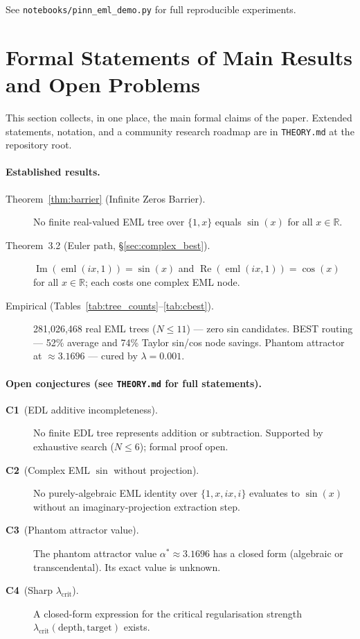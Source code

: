 \documentclass[11pt,a4paper]{article}
\begin{document}
See \texttt{notebooks/pinn\_eml\_demo.py} for full reproducible experiments.

\section{Formal Statements of Main Results and Open Problems}
\label{sec:formal}

This section collects, in one place, the main formal claims of the paper.
Extended statements, notation, and a community research roadmap are in
\texttt{THEORY.md} at the repository root.

\paragraph{Established results.}
\begin{description}
  \item[Theorem~\ref{thm:barrier} (Infinite Zeros Barrier).]
    No finite real-valued EML tree over $\{1,x\}$ equals $\sin(x)$
    for all $x\in\mathbb{R}$.
  \item[Theorem~3.2 (Euler path, \S\ref{sec:complex_best}).]
    $\operatorname{Im}(\operatorname{eml}(ix,1))=\sin(x)$ and
    $\operatorname{Re}(\operatorname{eml}(ix,1))=\cos(x)$ for all
    $x\in\mathbb{R}$; each costs one complex EML node.
  \item[Empirical (Tables~\ref{tab:tree_counts}--\ref{tab:cbest}).]
    281,026,468 real EML trees ($N\leq11$) — zero sin candidates.
    BEST routing — 52\% average and 74\% Taylor sin/cos node savings.
    Phantom attractor at $\approx3.1696$ — cured by $\lambda=0.001$.
\end{description}

\paragraph{Open conjectures (see \texttt{THEORY.md} for full statements).}
\begin{description}
  \item[\textbf{C1}~(EDL additive incompleteness).]
    No finite EDL tree represents addition or subtraction.
    Supported by exhaustive search ($N\leq6$); formal proof open.
  \item[\textbf{C2}~(Complex EML $\sin$ without projection).]
    No purely-algebraic EML identity over $\{1,x,ix,i\}$ evaluates to
    $\sin(x)$ without an imaginary-projection extraction step.
  \item[\textbf{C3}~(Phantom attractor value).]
    The phantom attractor value $\alpha^*\approx3.1696$ has a closed form
    (algebraic or transcendental).  Its exact value is unknown.
  \item[\textbf{C4}~(Sharp $\lambda_{\mathrm{crit}}$).]
    A closed-form expression for the critical regularisation strength
    $\lambda_{\mathrm{crit}}(\text{depth}, \text{target})$ exists.
\end{description}
\end{document}
